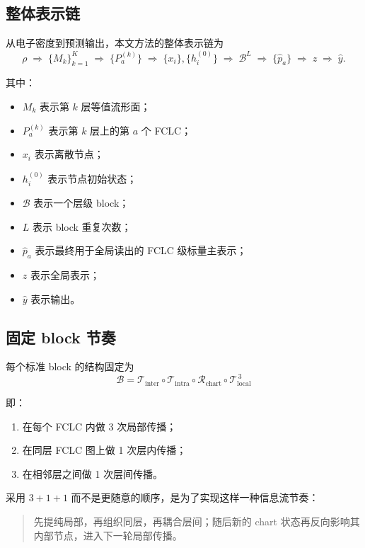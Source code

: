 \documentclass[12pt,a4paper]{ctexart}
\begin{document}
\subsection{整体表示链}

从电子密度到预测输出，本文方法的整体表示链为
\[
\rho
\;\Longrightarrow\;
\{M_k\}_{k=1}^{K}
\;\Longrightarrow\;
\{P_a^{(k)}\}
\;\Longrightarrow\;
\{x_i\}, \{h_i^{(0)}\}
\;\Longrightarrow\;
\mathcal B^{L}
\;\Longrightarrow\;
\{\hat p_a\}
\;\Longrightarrow\;
z
\;\Longrightarrow\;
\hat y.
\]

其中：
\begin{itemize}[leftmargin=2em]
    \item \(M_k\) 表示第 \(k\) 层等值流形面；
    \item \(P_a^{(k)}\) 表示第 \(k\) 层上的第 \(a\) 个 FCLC；
    \item \(x_i\) 表示离散节点；
    \item \(h_i^{(0)}\) 表示节点初始状态；
    \item \(\mathcal B\) 表示一个层级 block；
    \item \(L\) 表示 block 重复次数；
    \item \(\hat p_a\) 表示最终用于全局读出的 FCLC 级标量主表示；
    \item \(z\) 表示全局表示；
    \item \(\hat y\) 表示输出。
\end{itemize}

\subsection{固定 block 节奏}

每个标准 block 的结构固定为
\[
\boxed{
\mathcal B
=
\mathcal T_{\mathrm{inter}}
\circ
\mathcal T_{\mathrm{intra}}
\circ
\mathcal R_{\mathrm{chart}}
\circ
\mathcal T_{\mathrm{local}}^{\,3}
}
\]

即：
\begin{enumerate}[leftmargin=2em]
    \item 在每个 FCLC 内做 3 次局部传播；
    \item 在同层 FCLC 图上做 1 次层内传播；
    \item 在相邻层之间做 1 次层间传播。
\end{enumerate}

采用 \(3+1+1\) 而不是更随意的顺序，是为了实现这样一种信息流节奏：

\begin{quote}
先提纯局部，再组织同层，再耦合层间；随后新的 chart 状态再反向影响其内部节点，进入下一轮局部传播。
\end{quote}
\end{document}
